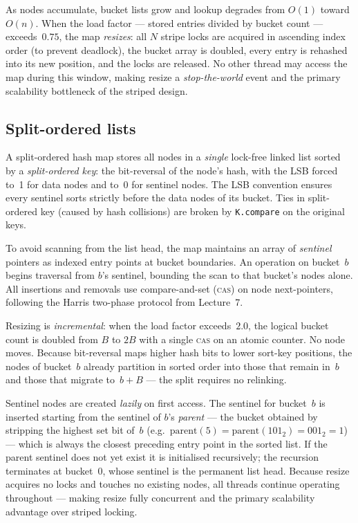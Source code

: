 \documentclass[11pt,a4paper]{article}
\begin{document}
As nodes accumulate, bucket lists grow and lookup degrades from $O(1)$ toward
$O(n)$. When the load factor --- stored entries divided by bucket count ---
exceeds~$0.75$, the map \emph{resizes}: all $N$ stripe locks are acquired in
ascending index order (to prevent deadlock), the bucket array is doubled, every
entry is rehashed into its new position, and the locks are released. No other
thread may access the map during this window, making resize a
\emph{stop-the-world} event and the primary scalability bottleneck of the
striped design.


\subsection{Split-ordered lists}
A split-ordered hash map stores all nodes in a \emph{single} lock-free linked
list sorted by a \emph{split-ordered key}: the bit-reversal of the node's hash,
with the LSB forced to~1 for data nodes and to~0 for sentinel nodes. The LSB
convention ensures every sentinel sorts strictly before the data nodes of its
bucket. Ties in split-ordered key (caused by hash collisions) are broken by
\texttt{K.compare} on the original keys.

To avoid scanning from the list head, the map maintains an array of
\emph{sentinel} pointers as indexed entry points at bucket boundaries. An
operation on bucket~$b$ begins traversal from $b$'s sentinel, bounding the
scan to that bucket's nodes alone. All insertions and removals use
compare-and-set (\textsc{cas}) on node next-pointers, following the
Harris two-phase protocol from Lecture~7.

Resizing is \emph{incremental}: when the load factor exceeds~$2.0$, the
logical bucket count is doubled from $B$ to $2B$ with a single \textsc{cas} on
an atomic counter. No node moves. Because bit-reversal maps higher hash bits to
lower sort-key positions, the nodes of bucket~$b$ already partition in sorted
order into those that remain in~$b$ and those that migrate to~$b+B$ — the
split requires no relinking.

Sentinel nodes are created \emph{lazily} on first access. The sentinel for
bucket~$b$ is inserted starting from the sentinel of $b$'s \emph{parent} —
the bucket obtained by stripping the highest set bit of~$b$ (e.g.\
$\text{parent}(5) = \text{parent}(101_2) = 001_2 = 1$) — which is always the
closest preceding entry point in the sorted list. If the parent sentinel does
not yet exist it is initialised recursively; the recursion terminates at
bucket~0, whose sentinel is the permanent list head. Because resize acquires no
locks and touches no existing nodes, all threads continue operating throughout
— making resize fully concurrent and the primary scalability advantage over
striped locking.
\end{document}
